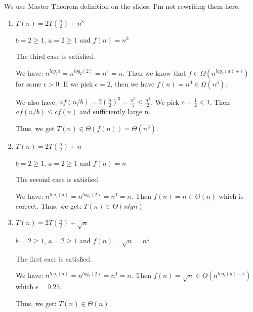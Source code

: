 \documentclass{cpsc413Solutions}
\begin{document}
\begin{problemlist}
\begin{problem}
\begin{answer}
\begin{enumerate}
\begin{itemize}
    \end{itemize}
        
\end{enumerate}

\end{answer}
\end{problem}

\begin{problem}
\begin{answer}
We use Master Theorem definition on the slides. I'm not rewriting them here.
\begin{enumerate}
    \item $T(n) = 2T(\frac{n}{2})+n^3$
    
    $b = 2 \geq 1$, $a = 2 \geq 1$ and $f(n) = n^3$
    
    The third case is satisfied.
    
    We have: $n^{log_ba} = n^{log_2(2)}= n^1 = n$. Then we know that $f \in \Omega(n^{log_b(a)+\epsilon})$ for some $ \epsilon > 0$. If we pick $\epsilon = 2$, then we have $f(n) = n^3 \in \Omega (n^3)$.
    
    We also have: $af(n/b) = 2(\frac{n}{2})^3 = \frac{n^3}{4} \leq \frac{n^3}{2}  $. We pick $c = \frac{1}{2} < 1$. Then $af(n/b) \leq cf(n)$ and sufficiently large n.
    
    Thus, we get $T(n) \in \Theta(f(n)) = \Theta(n^3)$.
    
    \item $T(n) = 2T(\frac{n}{2})+n$
    
    $b = 2 \geq 1$, $a = 2 \geq 1$ and $f(n) = n$
    
    The second case is satisfied. 
    
    We have: $n^{log_b(a)} = n^{log_2(2)} = n^1 = n$. Then $f(n) = n \in \Theta(n)$ which is correct. Thus, we get: $T(n) \in \Theta(nlgn)$
    
    \item $T(n) = 2T(\frac{n}{2})+\sqrt{n}$
    
    $b = 2 \geq 1$, $a = 2 \geq 1$ and $f(n) = \sqrt{n} = n^{\frac{1}{2}}$
    
    The first case is satisfied.
    
    We have:  $n^{log_b(a)} = n^{log_2(2)} = n^1 = n$. Then $f(n) = \sqrt{n} \in O(n^{log_b(a) -\epsilon})$ which $\epsilon = 0.25$.
    
    Thus, we get: $T(n) \in \Theta(n)$.
    

\end{enumerate}
\end{answer}
\end{problem}
\end{problemlist}
\end{document}
